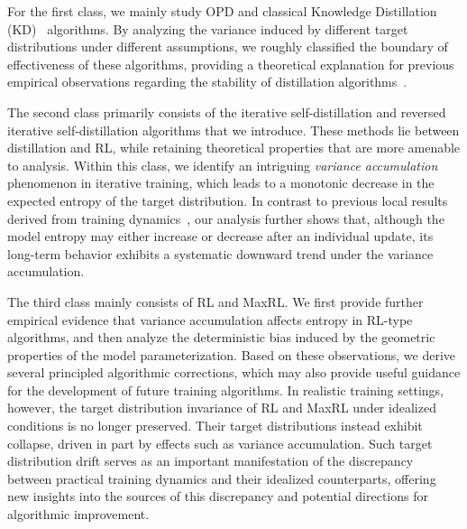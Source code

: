 For the first class, we mainly study OPD and classical Knowledge Distillation (KD)~\citep{hinton_distilling_2015} algorithms. By analyzing the variance induced by different target distributions under different assumptions, we roughly classified the boundary of effectiveness of these algorithms, providing a theoretical explanation for previous empirical observations regarding the stability of distillation algorithms~\citep{li_rethinking_2026, oh_kl_2026}.

The second class primarily consists of the iterative self-distillation and reversed iterative self-distillation algorithms that we introduce. These methods lie between distillation and RL, while retaining theoretical properties that are more amenable to analysis. Within this class, we identify an intriguing \emph{variance accumulation} phenomenon in iterative training, which leads to a monotonic decrease in the expected entropy of the target distribution. In contrast to previous local results derived from training dynamics~\citep{cui_entropy_2025, ren_learning_2025, jin_revisiting_2026}, our analysis further shows that, although the model entropy may either increase or decrease after an individual update, its long-term behavior exhibits a systematic downward trend under the variance accumulation.

The third class mainly consists of RL and MaxRL. We first provide further empirical evidence that variance accumulation affects entropy in RL-type algorithms, and then analyze the deterministic bias induced by the geometric properties of the model parameterization. Based on these observations, we derive several principled algorithmic corrections, which may also provide useful guidance for the development of future training algorithms. In realistic training settings, however, the target distribution invariance of RL and MaxRL under idealized conditions is no longer preserved. Their target distributions instead exhibit collapse, driven in part by effects such as variance accumulation. Such target distribution drift serves as an important manifestation of the discrepancy between practical training dynamics and their idealized counterparts, offering new insights into the sources of this discrepancy and potential directions for algorithmic improvement.


